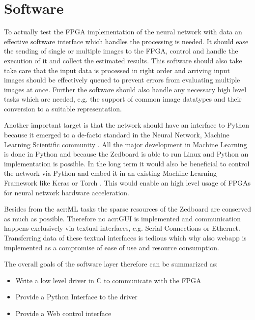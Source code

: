 \section{Software}

To actually test the FPGA implementation of the neural network with data an effective software interface which handles the processing is needed. It should ease the sending of single or multiple images to the FPGA, control and handle the execution of it and collect the estimated results. This software should also take take care that the input data is processed in right order and arriving input images should be effectively queued to prevent errors from evaluating multiple images at once. Further the software should also handle any necessary high level tasks which are needed, e.g. the support of common image datatypes and their conversion to a suitable representation.

Another important target is that the network should have an interface to Python because it emerged to a de-facto standard in the Neural Network, Machine Learning Scientific community \cite{Virtanen:2020aa}. All the major development in Machine Learning is done in Python and because the Zedboard is able to run Linux and Python an implementation is possible.
In the long term it would also be beneficial to control the network via Python and embed it in an existing Machine Learning Framework like Keras \cite{Gulli:2017aa} or Torch \cite{Paszke:2019aa}. This would enable an high level usage of FPGAs for neural network hardware acceleration. 

Besides from the \gls{acr:ML} tasks the sparse resources of the Zedboard are conserved as much as possible. Therefore no \gls{acr:GUI} is implemented and communication happens exclusively via textual interfaces, e.g. Serial Connections or Ethernet. Transferring data of these textual interfaces is tedious which why also webapp is implemented as a compromise of ease of use and resource consumption.

The overall goals of the software layer therefore can be summarized as:

\begin{itemize}
	\item Write a low level driver in C to communicate with the FPGA
	\item Provide a Python Interface to the driver
	\item Provide a Web control interface
\end{itemize}


